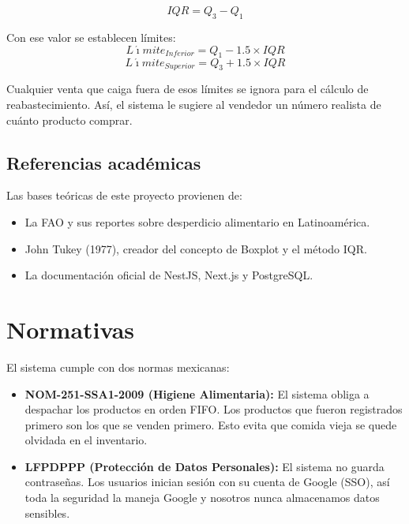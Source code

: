 \documentclass[12pt, a4paper]{article}
\begin{document}
\begin{equation}
IQR = Q_3 - Q_1
\end{equation}

Con ese valor se establecen límites:
\begin{equation}
L\acute{\imath}mite_{Inferior} = Q_1 - 1.5 \times IQR
\end{equation}
\begin{equation}
L\acute{\imath}mite_{Superior} = Q_3 + 1.5 \times IQR
\end{equation}

Cualquier venta que caiga fuera de esos límites se ignora para el cálculo de reabastecimiento. Así, el sistema le sugiere al vendedor un número realista de cuánto producto comprar.

\subsection{Referencias académicas}
Las bases teóricas de este proyecto provienen de:
\begin{itemize}
    \item La FAO y sus reportes sobre desperdicio alimentario en Latinoamérica.
    \item John Tukey (1977), creador del concepto de Boxplot y el método IQR.
    \item La documentación oficial de NestJS, Next.js y PostgreSQL.
\end{itemize}

\section{Normativas}
El sistema cumple con dos normas mexicanas:

\begin{itemize}
    \item \textbf{NOM-251-SSA1-2009 (Higiene Alimentaria):} El sistema obliga a despachar los productos en orden FIFO. Los productos que fueron registrados primero son los que se venden primero. Esto evita que comida vieja se quede olvidada en el inventario.
    \item \textbf{LFPDPPP (Protección de Datos Personales):} El sistema no guarda contraseñas. Los usuarios inician sesión con su cuenta de Google (SSO), así toda la seguridad la maneja Google y nosotros nunca almacenamos datos sensibles.
\end{itemize}
\end{document}
